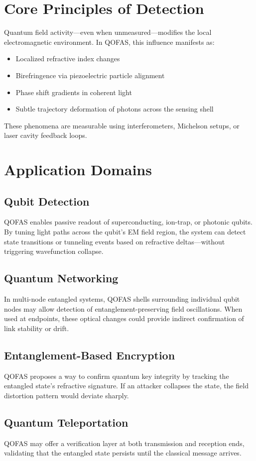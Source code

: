 \documentclass[11pt]{article}
\begin{document}
\section{Core Principles of Detection}
Quantum field activity---even when unmeasured---modifies the local electromagnetic environment. In QOFAS, this influence manifests as:
\begin{itemize}
  \item Localized refractive index changes
  \item Birefringence via piezoelectric particle alignment
  \item Phase shift gradients in coherent light
  \item Subtle trajectory deformation of photons across the sensing shell
\end{itemize}
These phenomena are measurable using interferometers, Michelson setups, or laser cavity feedback loops.

\section{Application Domains}
\subsection{Qubit Detection}
QOFAS enables passive readout of superconducting, ion-trap, or photonic qubits. By tuning light paths across the qubit’s EM field region, the system can detect state transitions or tunneling events based on refractive deltas---without triggering wavefunction collapse.

\subsection{Quantum Networking}
In multi-node entangled systems, QOFAS shells surrounding individual qubit nodes may allow detection of entanglement-preserving field oscillations. When used at endpoints, these optical changes could provide indirect confirmation of link stability or drift.

\subsection{Entanglement-Based Encryption}
QOFAS proposes a way to confirm quantum key integrity by tracking the entangled state’s refractive signature. If an attacker collapses the state, the field distortion pattern would deviate sharply.

\subsection{Quantum Teleportation}
QOFAS may offer a verification layer at both transmission and reception ends, validating that the entangled state persists until the classical message arrives.
\end{document}
